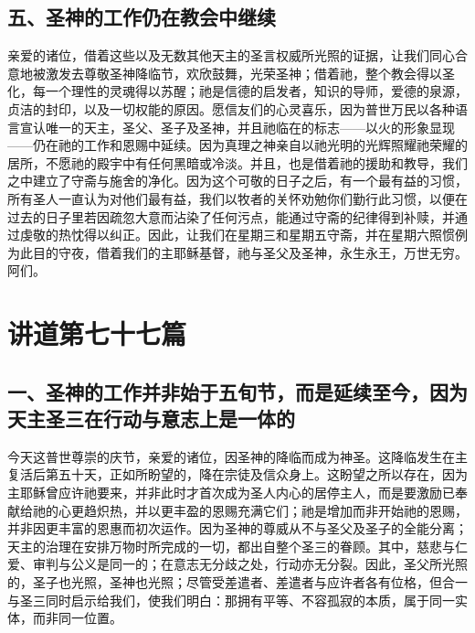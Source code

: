 
\subsection{五、圣神的工作仍在教会中继续}

亲爱的诸位，借着这些以及无数其他天主的圣言权威所光照的证据，让我们同心合意地被激发去尊敬圣神降临节，欢欣鼓舞，光荣圣神；借着祂，整个教会得以圣化，每一个理性的灵魂得以苏醒；祂是信德的启发者，知识的导师，爱德的泉源，贞洁的封印，以及一切权能的原因。愿信友们的心灵喜乐，因为普世万民以各种语言宣认唯一的天主，圣父、圣子及圣神，并且祂临在的标志——以火的形象显现——仍在祂的工作和恩赐中延续。因为真理之神亲自以祂光明的光辉照耀祂荣耀的居所，不愿祂的殿宇中有任何黑暗或冷淡。并且，也是借着祂的援助和教导，我们之中建立了守斋与施舍的净化。因为这个可敬的日子之后，有一个最有益的习惯，所有圣人一直认为对他们最有益，我们以牧者的关怀劝勉你们勤行此习惯，以便在过去的日子里若因疏忽大意而沾染了任何污点，能通过守斋的纪律得到补赎，并通过虔敬的热忱得以纠正。因此，让我们在星期三和星期五守斋，并在星期六照惯例为此目的守夜，借着我们的主耶稣基督，祂与圣父及圣神，永生永王，万世无穷。阿们。\par



\section{讲道第七十七篇}

\par


\subsection{一、圣神的工作并非始于五旬节，而是延续至今，因为天主圣三在行动与意志上是一体的}

今天这普世尊崇的庆节，亲爱的诸位，因圣神的降临而成为神圣。这降临发生在主复活后第五十天，正如所盼望的，降在宗徒及信众身上。这盼望之所以存在，因为主耶稣曾应许祂要来，并非此时才首次成为圣人内心的居停主人，而是要激励已奉献给祂的心更趋炽热，并以更丰盈的恩赐充满它们；祂是增加而非开始祂的恩赐，并非因更丰富的恩惠而初次运作。因为圣神的尊威从不与圣父及圣子的全能分离；天主的治理在安排万物时所完成的一切，都出自整个圣三的眷顾。其中，慈悲与仁爱、审判与公义是同一的；在意志无分歧之处，行动亦无分裂。因此，圣父所光照的，圣子也光照，圣神也光照；尽管受差遣者、差遣者与应许者各有位格，但合一与圣三同时启示给我们，使我们明白：那拥有平等、不容孤寂的本质，属于同一实体，而非同一位置。\par

